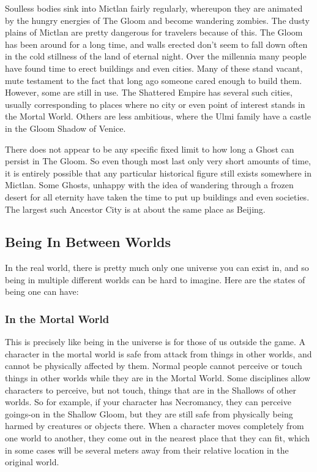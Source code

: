 Soulless bodies sink into Mictlan fairly regularly, whereupon they are animated by the hungry energies of The Gloom and become wandering zombies. The dusty plains of Mictlan are pretty dangerous for travelers because of this. The Gloom has been around for a long time, and walls erected don't seem to fall down often in the cold stillness of the land of eternal night. Over the millennia many people have found time to erect buildings and even cities. Many of these stand vacant, mute testament to the fact that long ago someone cared enough to build them. However, some are still in use. The Shattered Empire has several such cities, usually corresponding to places where no city or even point of interest stands in the Mortal World. Others are less ambitious, where the Ulmi family have a castle in the Gloom Shadow of Venice.

There does not appear to be any specific fixed limit to how long a Ghost can persist in The Gloom. So even though most last only very short amounts of time, it is entirely possible that any particular historical figure still exists somewhere in Mictlan. Some Ghosts, unhappy with the idea of wandering through a frozen desert for all eternity have taken the time to put up buildings and even societies. The largest such Ancestor City is at about the same place as Beijing.

\subsection{Being In Between Worlds}

In the real world, there is pretty much only one universe you can exist in, and so being in multiple different worlds can be hard to imagine. Here are the states of being one can have:

\subsubsection{In the Mortal World}
\hspace{\parindent} This is precisely like being in the universe is for those of us outside the game. A character in the mortal world is safe from attack from things in other worlds, and cannot be physically affected by them. Normal people cannot perceive or touch things in other worlds while they are in the Mortal World. Some disciplines allow characters to perceive, but not touch, things that are in the Shallows of other worlds. So for example, if your character has Necromancy, they can perceive goings-on in the Shallow Gloom, but they are still safe from physically being harmed by creatures or objects there. When a character moves completely from one world to another, they come out in the nearest place that they can fit, which in some cases will be several meters away from their relative location in the original world.

